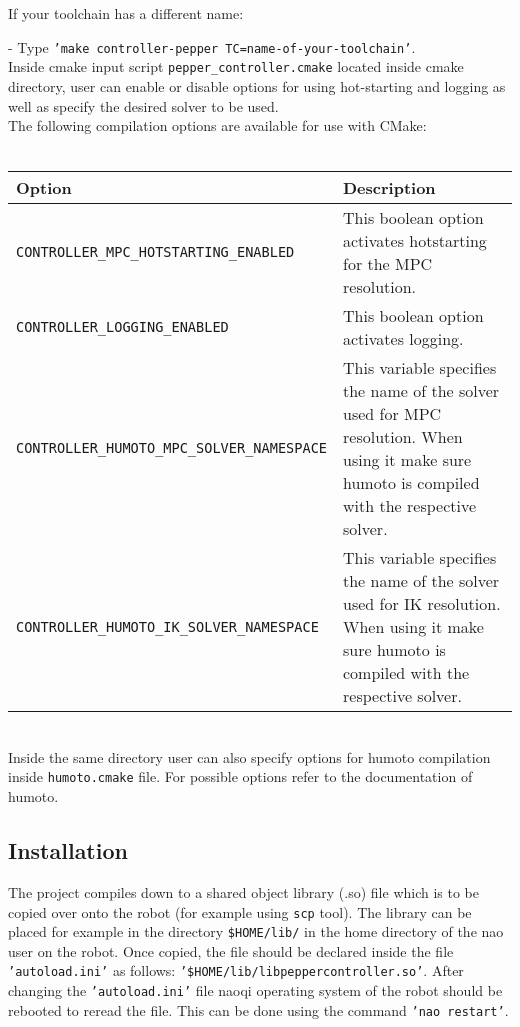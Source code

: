 \noindent If your toolchain has a different name:

- Type \texttt{'make controller-pepper TC=name-of-your-toolchain'}.\\

\noindent Inside cmake input script \texttt{pepper\_controller.cmake} located inside cmake directory, user can enable or disable
options for using hot-starting and logging as well as specify the desired solver to be used.\\

\noindent The following compilation options are available for use with CMake:\\ \\
\begin{tabular}{|l|p{5cm}|}
\hline
Option & Description \\
\hline
\texttt{CONTROLLER\_MPC\_HOTSTARTING\_ENABLED} & This boolean option activates hotstarting for the MPC resolution.\\
\hline
\texttt{CONTROLLER\_LOGGING\_ENABLED} & This boolean option activates logging.\\ \hline
\texttt{CONTROLLER\_HUMOTO\_MPC\_SOLVER\_NAMESPACE} & This variable specifies the name of the solver used for
MPC resolution. When using it make sure humoto is compiled with the respective solver. \\ \hline
\texttt{CONTROLLER\_HUMOTO\_IK\_SOLVER\_NAMESPACE} & This variable specifies the name of the solver used for IK
resolution. When using it make sure humoto is compiled with the respective solver.\\ 
\hline
\end{tabular} \\

\noindent Inside the same directory user can also specify options for humoto compilation inside \texttt{humoto.cmake} file.
For possible options refer to the documentation of humoto.

\subsection{Installation}
\noindent The project compiles down to a shared object library (.so) file which is to be copied over onto the robot (for example
using \texttt{scp} tool). The library can be placed for example in the directory \texttt{\$HOME/lib/} in the home directory of the nao user on the
robot. Once copied, the file should be declared inside the file \texttt{'autoload.ini'} as follows:
\texttt{'\$HOME/lib/libpeppercontroller.so'}. After changing the \texttt{'autoload.ini'} file naoqi operating system of the robot should be
rebooted to reread the file. This can be done using the command \texttt{'nao restart'}.

